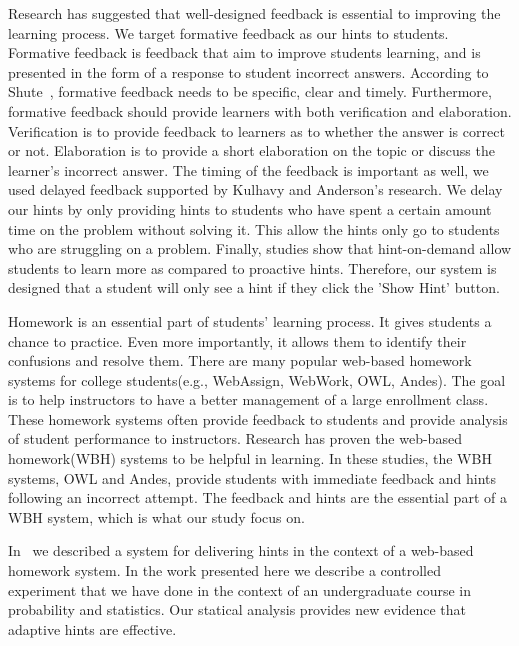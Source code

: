 \documentclass{llncs}
\begin{document}
Research has suggested that well-designed feedback is essential to improving the learning process\cite{Azevedo1995}\cite{Bangert-Drowns1991}. We target formative feedback as our hints to students. Formative feedback is feedback that aim to improve students learning, and is presented in the form of a response to student incorrect answers\cite{Shute2008}. According to Shute~\cite{Shute2008}, formative feedback needs to be specific, clear and timely. Furthermore, formative feedback should provide learners with both verification and elaboration\cite{Mason2001}\cite{Bangert-Drowns1991}. Verification is to provide feedback to learners as to whether the answer is correct or not. Elaboration is to provide a short elaboration on the topic or discuss the learner's incorrect answer. The timing of the feedback is important as well, we used delayed feedback supported by Kulhavy and Anderson's research\cite{Kulhavy1972}. We delay our hints by only providing hints to students who have spent a certain amount time on the problem without solving it. This allow the hints only go to students who are struggling on a problem. Finally, studies show that hint-on-demand allow students to learn more as compared to proactive hints\cite{Razzaq2010}. Therefore, our system is designed that a student will only see a hint if they click the 'Show Hint' button.

Homework is an essential part of students' learning process\cite{Cooper2006}. It gives students a chance to practice. Even more importantly, it allows them to identify their confusions and resolve them. There are many popular web-based homework systems for college students(e.g., WebAssign, WebWork, OWL, Andes). The goal is to help instructors to have a better management of a large enrollment class. These homework systems often provide feedback to students and provide analysis of student performance to instructors. Research has proven the web-based homework(WBH) systems to be helpful in learning\cite{MestHartRath2002}\cite{Vanlehn2005}. In these studies, the WBH systems, OWL and Andes, provide students with immediate feedback and hints following an incorrect attempt\cite{MestHartRath2002}\cite{Vanlehn2005}. The feedback and hints are the essential part of a WBH system, which is what our study focus on.

In~\cite{ElkherjFreund14} we described a system for delivering hints in the context of a web-based homework system. In the work presented here we describe a controlled experiment that we have done in the context of an undergraduate course in probability and statistics. Our statical analysis provides new evidence that adaptive hints are effective.
\end{document}
